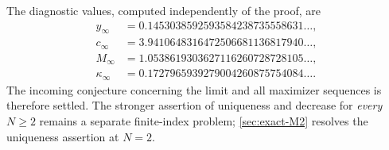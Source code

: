 The diagnostic values, computed independently of the proof, are
\begin{align*}
 y_\infty&=0.1453038592593584238735558631\ldots,\\
 c_\infty&=3.9410648316472506681136817940\ldots,\\
 M_\infty&=1.0538619303627116260728728105\ldots,\\
 \kappa_\infty&=0.1727965939279004260875754084\ldots.
\end{align*}
The incoming conjecture concerning the limit and all maximizer sequences
is therefore settled. The stronger assertion of uniqueness and decrease
for \emph{every} $N\ge2$ remains a separate finite-index problem;
\cref{sec:exact-M2} resolves the uniqueness assertion at $N=2$.

